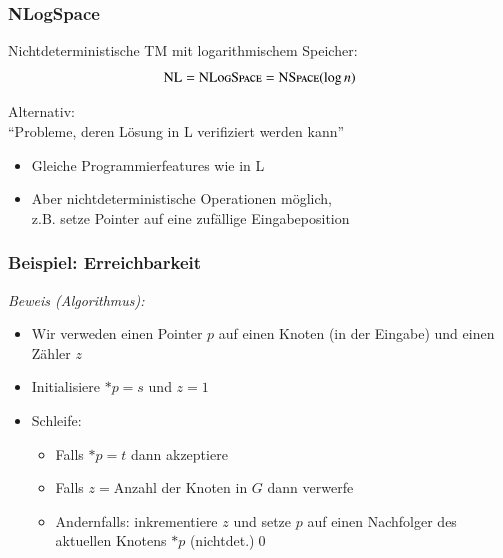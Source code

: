 \documentclass[onlymath]{beamer}
\begin{document}
\begin{frame}\frametitle{NLogSpace}

\alert{Nichtdeterministische TM mit logarithmischem Speicher:}
\[
{\textsc{NL}} = {\textsc{NLogSpace}} = {\textsc{NSpace}}(\log n)
\]

\alert{Alternativ:}\\
"`Probleme, deren Lösung in L verifiziert werden kann"'
\bigskip

\begin{itemize}
\item Gleiche Programmierfeatures wie in L
\item Aber nichtdeterministische Operationen möglich,\\ z.B. setze Pointer auf eine zufällige Eingabeposition
\end{itemize}

\end{frame}

\begin{frame}\frametitle{Beispiel: Erreichbarkeit}

\bigskip\pause

\pause

\emph{Beweis (Algorithmus):}
\begin{itemize}
\item Wir verweden einen Pointer $p$ auf einen Knoten (in der Eingabe) und einen Zähler $z$
\item Initialisiere $*p=s$ und $z=1$
\item Schleife:
\begin{itemize}
\item Falls $*p=t$ dann akzeptiere
\item Falls $z={}$Anzahl der Knoten in $G$ dann verwerfe
\item Andernfalls: inkrementiere $z$ und setze $p$ auf einen Nachfolger des aktuellen Knotens $*p$ (nichtdet.)\qed
\end{itemize}
\end{itemize}

\end{frame}
\end{document}
